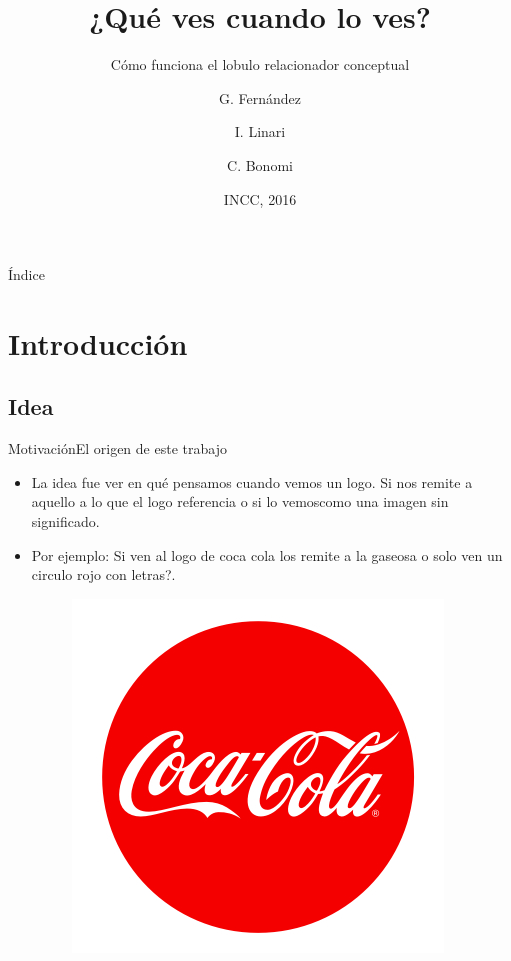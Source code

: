 \documentclass{beamer}
\title{¿Qué ves cuando lo ves?}
\subtitle{Cómo funciona el lobulo relacionador conceptual}
\author{G. Fernández \and I. Linari \and C. Bonomi}
\institute[UBA] %
{
  \inst{1}%
  Departmento de Computación\\
  Universidad de Buenos Aires
  \and
  \inst{2}%
  Department of Theoretical Philosophy\\
  University of Elsewhere}
\date{INCC, 2016}
\begin{document}
\begin{frame}
  \titlepage
\end{frame}

\begin{frame}{Índice}
  \tableofcontents
\end{frame}

\section{Introducción}

\subsection{Idea}

\begin{frame}{Motivación}{El origen de este trabajo}
  \begin{itemize}
  \item {
La idea fue ver en qué pensamos cuando vemos un logo. Si nos remite a aquello a lo que el logo referencia o si lo vemoscomo una imagen sin significado. 
  }
  \item {

Por ejemplo: Si ven al logo de coca cola los remite a la gaseosa o solo ven un circulo rojo con letras?.
  }
\begin{figure}[h]
 \centering
  \begin{minipage}[c]{1\textwidth}
	\centering	
	\includegraphics[scale=0.16]{img/cocacola.jpg}
  \end{minipage}
\end{figure}







 
  \end{itemize}
\end{frame}
\end{document}

